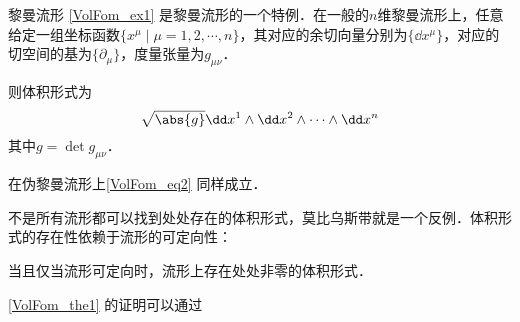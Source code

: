 \begin{example}{黎曼流形}
\autoref{VolFom_ex1} 是黎曼流形的一个特例．在一般的$n$维黎曼流形上，任意给定一组坐标函数$\{x^\mu\mid \mu=1, 2, \cdots, n\}$，其对应的余切向量分别为$\{\dd x^\mu\}$，对应的切空间的基为$\{\partial_\mu\}$，度量张量为$g_{\mu\nu}$．

则体积形式为
\begin{equation}\label{VolFom_eq2}
\sqrt{\abs{g}}\dd x^1\wedge \dd x^2\wedge \cdots \wedge \dd x^n
\end{equation}
其中$g=\det g_{\mu\nu}$．

在伪黎曼流形上\autoref{VolFom_eq2} 同样成立．
\end{example}



不是所有流形都可以找到处处存在的体积形式，莫比乌斯带就是一个反例．体积形式的存在性依赖于流形的可定向性：


\begin{theorem}{}\label{VolFom_the1}
当且仅当流形可定向时，流形上存在处处非零的体积形式．
\end{theorem}

\autoref{VolFom_the1} 的证明可以通过




















